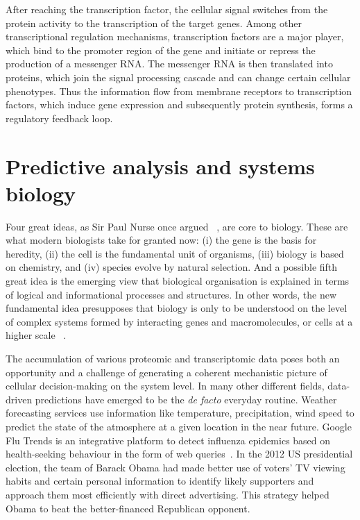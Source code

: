 After reaching the transcription factor, 
the cellular signal switches from the
protein activity to the transcription of the target genes. 
Among other transcriptional regulation mechanisms,
transcription factors are a major player,
which bind to the promoter region of the gene and initiate 
or repress the production
of a messenger RNA. The messenger RNA is then translated into proteins,
which join the signal processing cascade and can change certain cellular 
phenotypes. Thus the information flow from membrane receptors to transcription
factors, which induce gene expression and subsequently protein synthesis, 
forms a regulatory feedback loop.

\section{Predictive analysis and systems biology}
Four great ideas, as Sir Paul Nurse once argued~%
\citep{Nurse2003}, are core to biology. These are what
modern biologists take for granted now: (i) the gene is the basis for heredity, (ii) the cell is the fundamental unit of organisms, (iii) biology is based on chemistry, and (iv) species evolve by natural selection. And a possible fifth great 
idea is the emerging view that biological organisation is explained in terms of logical
and informational processes and structures. 
In other words, 
the new fundamental idea presupposes that biology is only to be 
understood
on the level of complex systems formed by interacting genes and macromolecules, or cells at a higher scale~%
\citep{Vidal2009}.

The accumulation of various proteomic and transcriptomic
data poses both an opportunity and a challenge of 
generating a coherent 
mechanistic picture of cellular decision-making on the 
system level. In many
other different fields, data-driven predictions have 
emerged to be the \emph{de facto} everyday routine. Weather
forecasting services use information like temperature, 
precipitation, wind speed to predict the state of the 
atmosphere at a given location in the near future. Google
Flu Trends is an integrative platform to detect influenza
epidemics based on health-seeking behaviour in the form of 
web queries~\citep{Ginsberg2009,Lazer2014}. 
In the 2012 US presidential
election, the team of Barack Obama had made better use of 
voters' TV viewing habits and certain personal information 
to identify likely supporters and
approach them most efficiently with direct advertising. 
This strategy helped Obama to beat the better-financed
Republican opponent.

